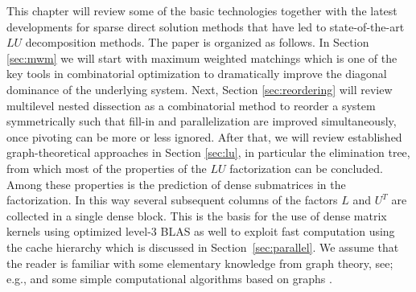 This chapter will review some of the basic technologies together
with the latest developments for sparse direct solution methods that have led to
state-of-the-art $LU$ decomposition methods.
The paper is organized as follows. In Section \ref{sec:mwm}
we will start with maximum weighted matchings which is one of the key
tools in combinatorial optimization to dramatically improve the diagonal dominance
of the underlying system.
Next, Section \ref{sec:reordering} will review multilevel nested dissection
as a combinatorial method to reorder a system symmetrically
such that fill-in and parallelization are improved simultaneously, once
pivoting can be more or less ignored.
After that, we will review established graph-theoretical approaches
in Section \ref{sec:lu}, in particular the elimination tree, from which
most of the properties of the $LU$ factorization can be concluded. Among
these properties is the prediction of dense submatrices in the
factorization. In this way several subsequent
columns of the factors $L$ and $U^T$ are collected in a single dense block. 
This is the basis for the use of dense matrix kernels using optimized
level-3 BLAS as well to exploit fast computation using the cache hierarchy which 
is discussed in Section~\ref{sec:parallel}.
We assume that the reader
 is familiar with some elementary knowledge from
graph theory, see; e.g., \cite{DufER86,GeoL81} and some simple
computational algorithms based on graphs \cite{AhoHU83}.

